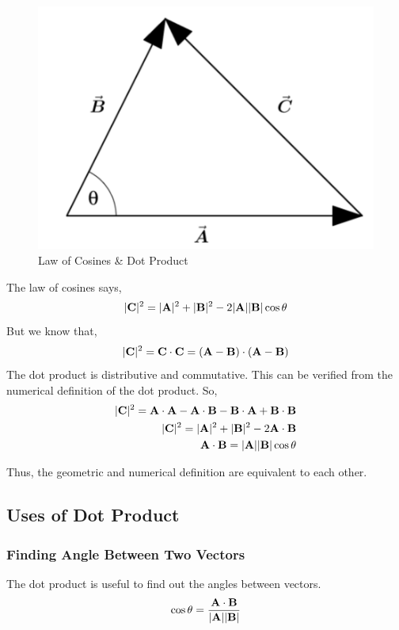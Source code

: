 \begin{figure}[ht!]
    \centering
    \includegraphics[scale=0.5]{./images/lecture_1_figure_2.png}
    \caption{Law of Cosines \& Dot Product}
\end{figure}

The law of cosines says, $$ |{\bf C}|^2 = |{\bf A}|^2 + |{\bf B}|^2 - 2|{\bf A}||{\bf B}|\cos \theta $$
But we know that, $$|{\bf C}|^2 = {\bf C} \cdot {\bf C} = ({\bf A} - {\bf B}) \cdot ({\bf A} - {\bf B}) $$
The dot product is distributive and commutative. This can be verified from the numerical definition of the dot product.
So, 
\begin{eqnarray*}
    |{\bf C}|^2 = {\bf A} \cdot {\bf A} - {\bf A} \cdot {\bf B} - {\bf B} \cdot {\bf A} + {\bf B} \cdot {\bf B} \\
    |{\bf C}|^2 = |{\bf A}|^2 + |{\bf B}|^2 - 2 {\bf A} \cdot {\bf B} \\
    {\bf A} \cdot {\bf B} = |{\bf A}||{\bf B}| \cos \theta 
\end{eqnarray*}

Thus, the geometric and numerical definition are equivalent to each other.

\subsection{Uses of Dot Product}

\subsubsection{Finding Angle Between Two Vectors}

The dot product is useful to find out the angles between vectors.
$$ \cos \theta = \frac{ {\bf A} \cdot {\bf B} }{ |{\bf A}| |{\bf B}| } $$

